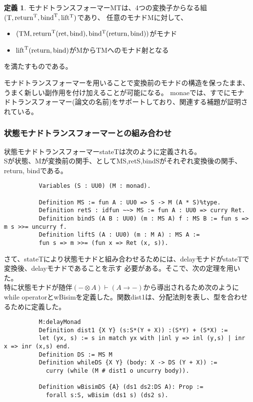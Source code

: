 \documentclass[japanese]{jssst_ppl}
\theoremstyle{definition}
\newtheorem{definition}[theorem]{定義}
\newcommand{\bind}{\rm{bind}}
\newcommand{\ret}{\rm{return}}
\begin{document}
\begin{definition}
  モナドトランスフォーマーMTは、4つの変換子からなる組$(\text{T},\ret^T,\bind^T,lift^T)$であり、
  任意のモナドMに対して、
  \begin{itemize}
    \item $(\text{TM}, \ret^T(ret, \bind), bind^T(\ret,\bind))$がモナド
    \item $\text{lift}^\text{T}(\ret,\bind)$がMからTMへのモナド射となる
  \end{itemize}
  を満たすものである。
\end{definition}
モナドトランスフォーマーを用いることで変換前のモナドの構造を保ったまま、うまく新しい副作用を付け加えることが可能になる。
monaeでは、すでにモナドトランスフォーマー(論文の名前)をサポートしており、関連する補題が証明されている。

\subsubsection{状態モナドトランスフォーマーとの組み合わせ}
状態モナドトランスフォーマーstateTは次のように定義される。\\
Sが状態、Mが変換前の関手、としてMS,retS,bindSがそれぞれ変換後の関手、return, bindである。

\begin{verbatim}
          Variables (S : UU0) (M : monad).
          
          Definition MS := fun A : UU0 => S -> M (A * S)%type.
          Definition retS : idfun ~~> MS := fun A : UU0 => curry Ret.
          Definition bindS (A B : UU0) (m : MS A) f : MS B := fun s => m s >>= uncurry f.
          Definition liftS (A : UU0) (m : M A) : MS A :=
          fun s => m >>= (fun x => Ret (x, s)).
        \end{verbatim}

さて、stateTにより状態モナドと組み合わせるためには、delayモナドがstateTで変換後、delayモナドであることを示す
必要がある。そこで、次の定理を用いた。\\


特に状態モナドが随伴$(- \otimes A) \vdash (A \rightarrow - )$から導出されるため次のように
while operatorとwBisimを定義した。関数dist1は、分配法則を表し、型を合わせるために定義した。


\begin{verbatim}
          M:delayMonad
          Definition dist1 {X Y} (s:S*(Y + X)) :(S*Y) + (S*X) :=
          let (yx, s) := s in match yx with |inl y => inl (y,s) | inr x => inr (x,s) end.
          Definition DS := MS M
          Definition whileDS {X Y} (body: X -> DS (Y + X)) :=
            curry (while (M # dist1 o uncurry body)).
        
          Definition wBisimDS {A} (ds1 ds2:DS A): Prop :=
            forall s:S, wBisim (ds1 s) (ds2 s).
          \end{verbatim}
\end{document}
